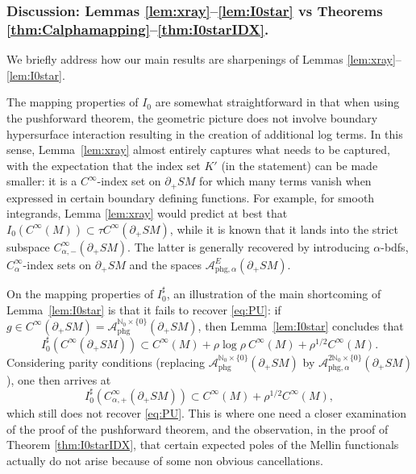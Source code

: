 \documentclass[JEP,XML,SOM,Unicode,NoFloatCountersInSection, NoEqCountersInSection,published]{cedram}
\theoremstyle{plain}
\theoremstyle{definition}
\theoremstyle{remark}
\def\Nm{{\mathbb{N}}}
\def\A{\mathcal{A}}
\newcommand{\adj}{I_0^\sharp}
\newcommand{\phg}{\mathrm{phg}}
\begin{document}
\subsubsection*{Discussion: Lemmas \ref{lem:xray}--\ref{lem:I0star} vs Theorems \ref{thm:Calphamapping}--\ref{thm:I0starIDX}.}

We briefly address how our main results are sharpenings of Lemmas \ref{lem:xray}--\ref{lem:I0star}.

The mapping properties of $I_0$ are somewhat straightforward in that when using the pushforward theorem, the geometric picture does not involve boundary hypersurface interaction resulting in the creation of additional log terms. In this sense, Lemma~\ref{lem:xray} almost entirely captures what needs to be captured, with the expectation that the index set $K'$ (in the statement) can be made smaller: it is a $C^\infty$-index set on $\partial_+ SM$ for which many terms vanish when expressed in certain boundary defining functions. For example, for smooth integrands, Lemma \ref{lem:xray} would predict at best that $I_0 (C^\infty(M))\subset \tau C^\infty(\partial_+ SM)$, while it is known that it lands into the strict subspace $C_{\alpha,-}^\infty(\partial_+ SM)$. The latter is generally recovered by introducing $\alpha$-bdfs, $C_\alpha^\infty$-index sets on $\partial_+ SM$ and the spaces $\A_{\phg,\alpha}^E (\partial_+ SM)$.

On the mapping properties of $\adj$, an illustration of the main shortcoming of Lemma~\ref{lem:I0star} is that it fails to recover \eqref{eq:PU}: if $g\in C^\infty(\partial_+ SM) = \A^{\Nm_0\times \{0\}}_{\phg}(\partial_+ SM)$, then Lemma~\ref{lem:I0star} concludes that
\begin{equation*}
\adj (C^\infty(\partial_+ SM)) \subset C^\infty(M) + \rho\log \rho\ C^\infty(M) + \rho^{1/2} C^\infty(M).
\end{equation*}
Considering parity conditions (\eg replacing $\A^{\Nm_0\times \{0\}}_{\phg}(\partial_+ SM)$ by $\A^{2\Nm_0\times \{0\}}_{\phg,\alpha}(\partial_+ SM)$), one then arrives at
\begin{equation*}
\adj (C_{\alpha,+}^\infty(\partial_+ SM)) \subset C^\infty(M) + \rho^{1/2} C^\infty(M),
\end{equation*}
which still does not recover \eqref{eq:PU}. This is where one need a closer examination of the proof of the pushforward theorem, and the observation, in the proof of Theorem \ref{thm:I0starIDX}, that certain expected poles of the Mellin functionals actually do not arise because of some non obvious cancellations.

\backmatter


\end{document}
